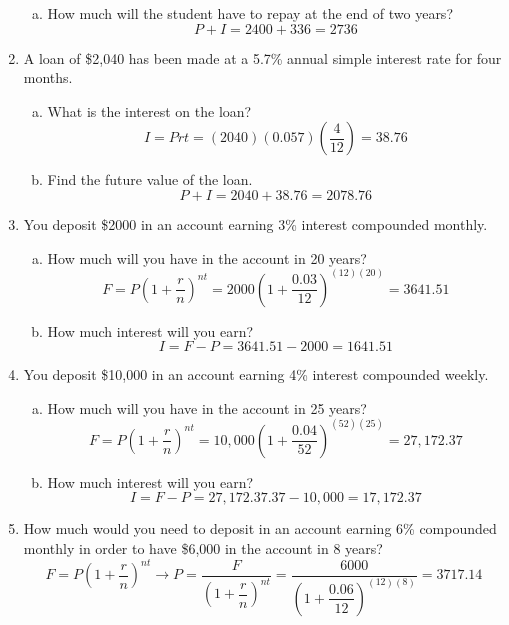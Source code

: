 \begin{enumerate}
\begin{enumerate}[(a)]
\item How much will the student have to repay at the end of two years? 
\[P + I = 2400 + 336 = 2736\]
\end{enumerate}

\item A loan of \$2,040 has been made at a 5.7\% annual simple interest rate for four months.  
\begin{enumerate}[(a)]
\item What is the interest on the loan? 
\[I = Prt = (2040)(0.057)\left(\dfrac{4}{12}\right) = 38.76\]

\item Find the future value of the loan. 
\[P + I = 2040 + 38.76 = 2078.76\]
\end{enumerate}

\item You deposit \$2000 in an account earning 3\% interest compounded monthly.
\begin{enumerate}[(a)]
\item How much will you have in the account in 20 years? 
\[F = P\left(1 + \dfrac{r}{n}\right)^{nt} = 2000\left(1 + \dfrac{0.03}{12}\right)^{(12)(20)} = 3641.51\]

\item How much interest will you earn? 
\[I = F - P = 3641.51 - 2000 = 1641.51\]
\end{enumerate}
\pagebreak

\item You deposit \$10,000 in an account earning 4\% interest compounded weekly.
\begin{enumerate}[(a)]
\item How much will you have in the account in 25 years? 
\[F = P\left(1 + \dfrac{r}{n}\right)^{nt} = 10,000\left(1 + \dfrac{0.04}{52}\right)^{(52)(25)} = 27,172.37\]

\item How much interest will you earn? 
\[I = F - P = 27,172.37.37 - 10,000 = 17,172.37\]
\end{enumerate}

\item How much would you need to deposit in an account earning 6\% compounded monthly in order to have \$6,000 in the account in 8 years? 
\[F = P\left(1 + \dfrac{r}{n}\right)^{nt} \longrightarrow P = \dfrac{F}{\left(1 + \dfrac{r}{n}\right)^{nt}} = \dfrac{6000}{\left(1 + \dfrac{0.06}{12}\right)^{(12)(8)}} = 3717.14\]


\end{enumerate}
